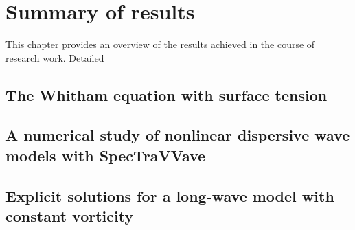 \chapter{Summary of results}

This chapter provides an overview of the results achieved in the course of research work. 
Detailed 




\section{The Whitham equation with surface tension}






\section{A numerical study of nonlinear dispersive wave models with SpecTraVVave}





\section{Explicit solutions for a long-wave model with constant vorticity}
